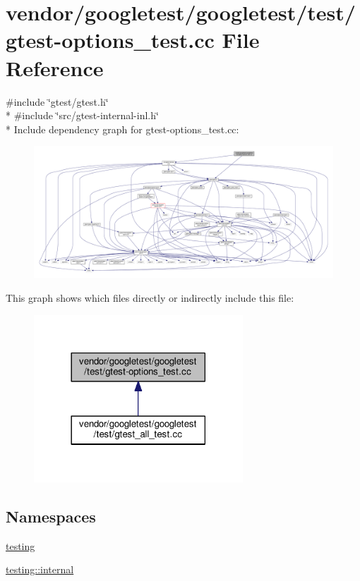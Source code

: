 \hypertarget{gtest-options__test_8cc}{}\section{vendor/googletest/googletest/test/gtest-\/options\+\_\+test.cc File Reference}
\label{gtest-options__test_8cc}
{\ttfamily \#include \char`\"{}gtest/gtest.\+h\char`\"{}}\\*
{\ttfamily \#include \char`\"{}src/gtest-\/internal-\/inl.\+h\char`\"{}}\\*
Include dependency graph for gtest-\/options\+\_\+test.cc\+:\nopagebreak
\begin{figure}[H]
\begin{center}
\leavevmode
\includegraphics[width=350pt]{gtest-options__test_8cc__incl}
\end{center}
\end{figure}
This graph shows which files directly or indirectly include this file\+:\nopagebreak
\begin{figure}[H]
\begin{center}
\leavevmode
\includegraphics[width=222pt]{gtest-options__test_8cc__dep__incl}
\end{center}
\end{figure}
\subsection*{Namespaces}
\begin{DoxyCompactItemize}
\item 
 \hyperlink{namespacetesting}{testing}
\item 
 \hyperlink{namespacetesting_1_1internal}{testing\+::internal}
\end{DoxyCompactItemize}
